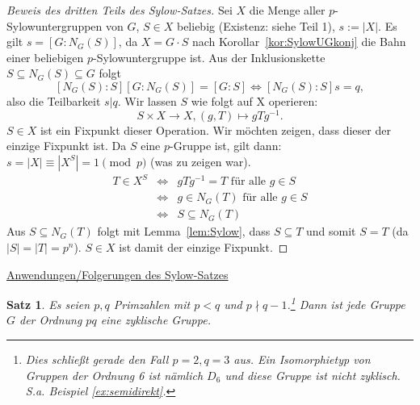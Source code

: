 \documentclass[12pt]{scrartcl} %
\newtheorem{thm}{Satz}[section]
\theoremstyle{definition}
\theoremstyle{remark}
\begin{document}
\begin{proof}[Beweis des dritten Teils des Sylow-Satzes]
	Sei $X$ die Menge aller $p$-Sylowuntergruppen von $G$, $S \in X$ beliebig (Existenz: siehe Teil 1), $s := |X|$.
	Es gilt $s = [G:N_G(S)]$, da \(X = G\cdot S\) nach Korollar~\ref{kor:SylowUGkonj} die Bahn einer beliebigen \(p\)-Sylowuntergruppe ist.
	Aus der Inklusionskette $S \subseteq N_G(S) \subseteq G$ folgt
	$$[N_G(S):S] [G:N_G(S)] = [G:S] \Leftrightarrow [N_G(S):S] s = q,$$
	also die Teilbarkeit \(s | q\).
	Wir lassen $S$ wie folgt auf X operieren:
	$$S \times X \rightarrow X, (g, T) \mapsto gTg^{-1}.$$
	$S \in X$ ist ein Fixpunkt dieser Operation.
	Wir möchten zeigen, dass dieser der einzige Fixpunkt ist.
	Da $S$ eine $p$-Gruppe ist, gilt dann: $s = |X| \equiv |X^S| = 1 \pmod{p}$ (was zu zeigen war).
	\begin{align*}
		T \in X^S &\Leftrightarrow &gTg^{-1} = T \text{ für alle } g \in S \\
		&\Leftrightarrow &g \in N_G(T) \text{ für alle } g \in S \\
		&\Leftrightarrow &S \subseteq N_G(T)
	\end{align*}
	Aus $S \subseteq N_G(T)$ folgt mit Lemma~\ref{lem:Sylow}, dass $S \subseteq T$ und somit $S = T$ (da $|S| = |T| = p^n$).
	$S \in X$ ist damit der einzige Fixpunkt.
\end{proof}

\underline{Anwendungen/Folgerungen des Sylow-Satzes}

\begin{thm}
	Es seien $p, q$ Primzahlen mit $p < q$ und $p \nmid q-1$.\footnote{Dies schließt gerade den Fall $p = 2, q = 3$ aus. Ein Isomorphietyp von Gruppen der Ordnung 6 ist nämlich $D_6$ und diese Gruppe ist nicht zyklisch. S.a. Beispiel \ref{ex:semidirekt}.}
	Dann ist jede Gruppe $G$ der Ordnung $pq$ eine zyklische Gruppe.
\end{thm}
\end{document}

